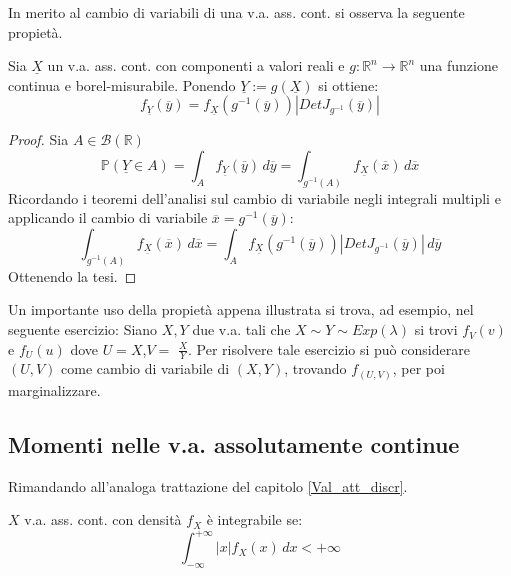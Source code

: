 In merito al cambio di variabili di una v.a. ass. cont. si osserva la seguente propietà.

\begin{proposition}
Sia $\underline{X}$ un v.a. ass. cont. con componenti a valori reali e $g:\mathbb{R}^n\longrightarrow\mathbb{R}^n$ una funzione continua e borel-misurabile. 
\newline
Ponendo $\underline{Y}:=g(\underline{X})$ si ottiene:
\[f_{\underline{Y}}(\overline{y})=f_{\underline{X}}(g^{-1}(\overline{y}))|DetJ_{g^{-1}}(\overline{y})| \]
\vspace{5px}
\begin{proof}
Sia $A\in\mathcal{B}(\mathbb{R})$
\[\mathbb{P}(\underline{Y}\in A) = \int_A f_{\underline{Y}}(\overline{y}) \,d\overline{y} = \int_{g^{-1}(A)} f_{\underline{X}}(\overline{x}) \,d\overline{x}\]
Ricordando i teoremi dell'analisi sul cambio di variabile negli integrali multipli e applicando il cambio di variabile $\overline{x}=g^{-1}(\overline{y})$:
\[\int_{g^{-1}(A)} f_{\underline{X}}(\overline{x}) \,d\overline{x} = \int_{A} f_{\underline{X}}(g^{-1}(\overline{y}))|DetJ_{g^{-1}}(\overline{y})| \,d\overline{y}\]
Ottenendo la tesi.
\end{proof}
\end{proposition}

\vspace{10px}

Un importante uso della propietà appena illustrata si trova, ad esempio, nel seguente esercizio:
\vspace{5px}
\newline
Siano $X,Y$ due v.a. tali che $X\sim Y\sim Exp(\lambda)$ si trovi $f_V(v)$ e $f_U(u)$ dove $U=X$,$V=$ {\large $\frac{X}{Y}$}.
\vspace{5px}
\newline
Per risolvere tale esercizio si può considerare $(U,V)$ come cambio di variabile di $(X,Y)$, trovando $f_{(U,V)}$, per poi marginalizzare.

\newpage

\subsection{Momenti nelle v.a. assolutamente continue}

Rimandando all'analoga trattazione del capitolo \ref{Val_att_discr}.
\begin{definition}
$X$ v.a. ass. cont. con densità $f_X$ è integrabile se: \[\int_{-\infty}^{+\infty} |x|f_X(x) \,dx < +\infty\]
\end{definition}


